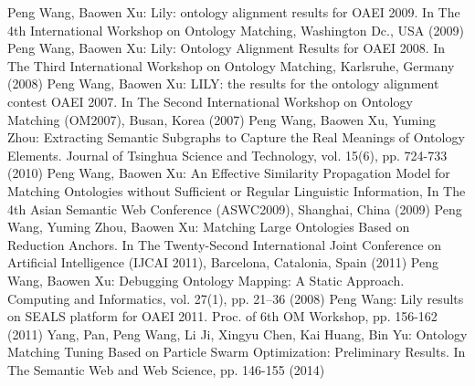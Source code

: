 \documentclass{llncs}
\begin{document}
\begin{thebibliography}{}
Peng Wang, Baowen Xu:
Lily: ontology alignment results for OAEI 2009.
In The 4th International Workshop on Ontology Matching, Washington Dc., USA (2009)
Peng Wang, Baowen Xu: 
Lily: Ontology Alignment Results for OAEI 2008. 
In The Third International Workshop on Ontology Matching, Karlsruhe, Germany (2008)
Peng Wang, Baowen Xu: 
LILY: the results for the ontology alignment contest OAEI 2007. 
In The Second International Workshop on Ontology Matching (OM2007), Busan, Korea (2007)
Peng Wang, Baowen Xu, Yuming Zhou:
Extracting Semantic Subgraphs to Capture the Real Meanings of Ontology Elements.
Journal of Tsinghua Science and Technology, vol. 15(6), pp. 724-733 (2010)
Peng Wang, Baowen Xu:
An Effective Similarity Propagation Model for Matching Ontologies without Sufficient or Regular Linguistic Information,
In The 4th Asian Semantic Web Conference (ASWC2009), Shanghai, China (2009)
Peng Wang, Yuming Zhou, Baowen Xu:
Matching Large Ontologies Based on Reduction Anchors.
In The Twenty-Second International Joint Conference on Artificial Intelligence (IJCAI 2011), Barcelona, Catalonia, Spain (2011)
Peng Wang, Baowen Xu:
Debugging Ontology Mapping: A Static Approach.
Computing and Informatics, vol. 27(1), pp. 21–36 (2008)
Peng Wang:
Lily results on SEALS platform for OAEI 2011.
Proc. of 6th OM Workshop, pp. 156-162 (2011)
Yang, Pan, Peng Wang, Li Ji, Xingyu Chen, Kai Huang, Bin Yu:
Ontology Matching Tuning Based on Particle Swarm Optimization: Preliminary Results.
In The Semantic Web and Web Science, pp. 146-155 (2014)
\end{thebibliography}

\clearpage
\end{document}
